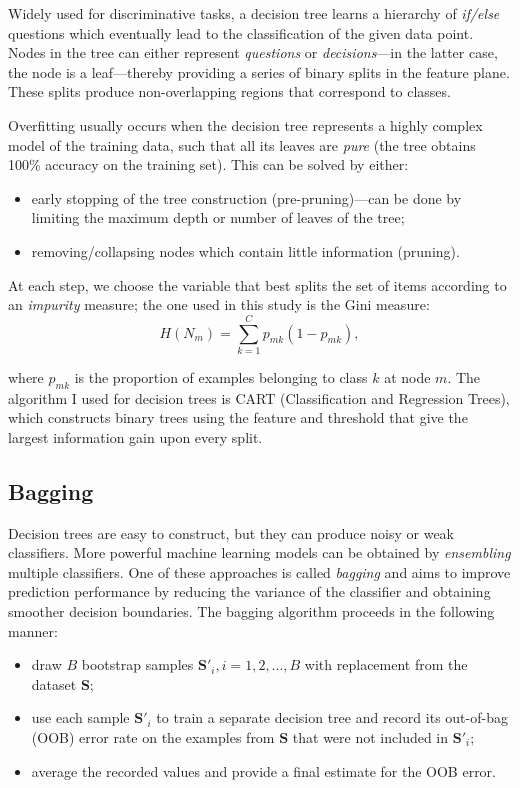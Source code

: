 \documentclass[11pt]{article}
\numberwithin{equation}{section}
\begin{document}
Widely used for discriminative tasks, a decision tree learns a hierarchy of \textit{if/else} questions which eventually lead to the classification of the given data point. Nodes in the tree can either represent \textit{questions} or \textit{decisions}---in the latter case, the node is a leaf---thereby providing a series of binary splits in the feature plane. These splits produce non-overlapping regions that correspond to classes.

Overfitting usually occurs when the decision tree represents a highly complex model of the training data, such that all its leaves are \textit{pure} (the tree obtains 100\% accuracy on the training set). This can be solved by either:
\begin{itemize}
\item early stopping of the tree construction (pre-pruning)---can be done by limiting the maximum depth or number of leaves of the tree;
\item removing/collapsing nodes which contain little information (pruning).
\end{itemize}

At each step, we choose the variable that best splits the set of items according to an \textit{impurity} measure; the one used in this study is the Gini measure:
\begin{equation}
H(N_m) = \sum_{k = 1}^{C} p_{mk} (1 - p_{mk}),
\end{equation}

where $p_{mk}$ is the proportion of examples belonging to class $k$ at node $m$. The algorithm I used for decision trees is CART (Classification and Regression Trees), which constructs binary trees using the feature and threshold that give the largest information gain upon every split.

\subsection{Bagging}

Decision trees are easy to construct, but they can produce noisy or weak classifiers. More powerful machine learning models can be obtained by \textit{ensembling} multiple classifiers. One of these approaches is called \textit{bagging} and aims to improve prediction performance by reducing the variance of the classifier and obtaining smoother decision boundaries. The bagging algorithm proceeds in the following manner:
\begin{itemize}
\item draw $B$ bootstrap samples $\mathbf{S'}_i, i = 1, 2, ..., B$ with replacement from the dataset $\mathbf{S}$;
\item use each sample $\mathbf{S'}_i$ to train a separate decision tree and record its out-of-bag (OOB) error rate on the examples from $\mathbf{S}$ that were not included in $\mathbf{S'}_i$;
\item average the recorded values and provide a final estimate for the OOB error.
\end{itemize}
\end{document}
